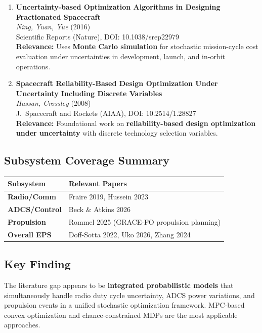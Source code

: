 \documentclass[11pt]{article}
\begin{document}
\begin{enumerate}[label=\textbf{\arabic*.},resume]
    \item \textbf{Uncertainty-based Optimization Algorithms in Designing Fractionated Spacecraft}\\
    \textit{Ning, Yuan, Yue} (2016)\\
    Scientific Reports (Nature), DOI: 10.1038/srep22979\\
    \textbf{Relevance:} Uses \textbf{Monte Carlo simulation} for stochastic mission-cycle cost evaluation under uncertainties in development, launch, and in-orbit operations.

    \item \textbf{Spacecraft Reliability-Based Design Optimization Under Uncertainty Including Discrete Variables}\\
    \textit{Hassan, Crossley} (2008)\\
    J.\ Spacecraft and Rockets (AIAA), DOI: 10.2514/1.28827\\
    \textbf{Relevance:} Foundational work on \textbf{reliability-based design optimization under uncertainty} with discrete technology selection variables.
\end{enumerate}

\subsection{Subsystem Coverage Summary}

\begin{center}
\begin{tabular}{@{}ll@{}}
\toprule
Subsystem & Relevant Papers \\
\midrule
\textbf{Radio/Comm} & Fraire 2019, Hussein 2023 \\
\textbf{ADCS/Control} & Beck \& Atkins 2026 \\
\textbf{Propulsion} & Rommel 2025 (GRACE-FO propulsion planning) \\
\textbf{Overall EPS} & Doff-Sotta 2022, Uko 2026, Zhang 2024 \\
\bottomrule
\end{tabular}
\end{center}

\subsection{Key Finding}
The literature gap appears to be \textbf{integrated probabilistic models} that simultaneously handle radio duty cycle uncertainty, ADCS power variations, and propulsion events in a unified stochastic optimization framework. MPC-based convex optimization and chance-constrained MDPs are the most applicable approaches.
\end{document}
